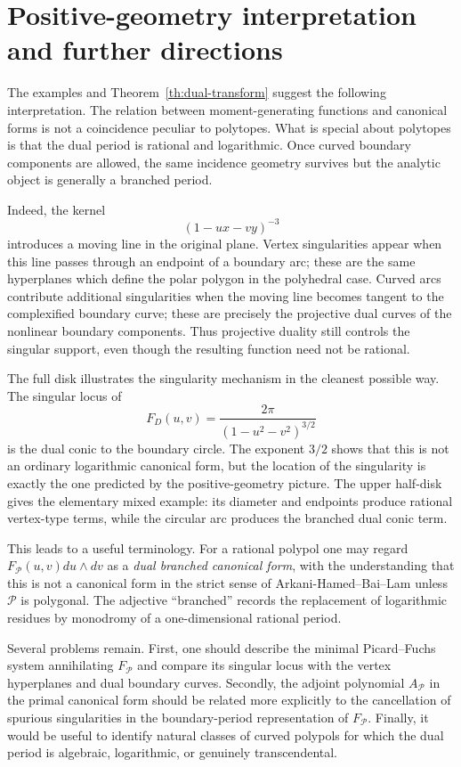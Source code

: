 \documentclass[10pt,a4paper,reqno]{amsart}
\newcommand {\cP} {\mathcal P}
\theoremstyle{plain}
\theoremstyle{definition}
\begin{document}
\section{Positive-geometry interpretation and further directions}
\label{sec:beyond-polytopes}

The examples and Theorem~\ref{th:dual-transform} suggest the following
interpretation.  The relation between moment-generating functions and canonical
forms is not a coincidence peculiar to polytopes.  What is special about
polytopes is that the dual period is rational and logarithmic.  Once curved
boundary components are allowed, the same incidence geometry survives but the
analytic object is generally a branched period.

Indeed, the kernel
\[
        (1-ux-vy)^{-3}
\]
introduces a moving line in the original plane.  Vertex singularities appear
when this line passes through an endpoint of a boundary arc; these are the same
hyperplanes which define the polar polygon in the polyhedral case.  Curved arcs
contribute additional singularities when the moving line becomes tangent to the
complexified boundary curve; these are precisely the projective dual curves of
the nonlinear boundary components.  Thus projective duality still controls the
singular support, even though the resulting function need not be rational.

The full disk illustrates the singularity mechanism in the cleanest possible way.  The singular locus
of
\[
        F_D(u,v)=\frac{2\pi}{(1-u^2-v^2)^{3/2}}
\]
is the dual conic to the boundary circle.  The exponent $3/2$ shows that this is
not an ordinary logarithmic canonical form, but the location of the singularity
is exactly the one predicted by the positive-geometry picture.  The upper
half-disk gives the elementary mixed example: its diameter and endpoints produce
rational vertex-type terms, while the circular arc produces the branched dual
conic term.

This leads to a useful terminology.  For a rational polypol one may regard
$F_{\cP}(u,v)du\wedge dv$ as a \emph{dual branched canonical form}, with the
understanding that this is not a canonical form in the strict sense of
Arkani-Hamed--Bai--Lam unless $\cP$ is polygonal.  The adjective ``branched''
records the replacement of logarithmic residues by monodromy of a
one-dimensional rational period.

Several problems remain.  First, one should describe the minimal
Picard--Fuchs system annihilating $F_{\cP}$ and compare its singular locus with
the vertex hyperplanes and dual boundary curves.  Secondly, the adjoint
polynomial $A_{\cP}$ in the primal canonical form should be related more
explicitly to the cancellation of spurious singularities in the boundary-period
representation of $F_{\cP}$.  Finally, it would be useful to identify natural
classes of curved polypols for which the dual period is algebraic, logarithmic,
or genuinely transcendental.
\end{document}
